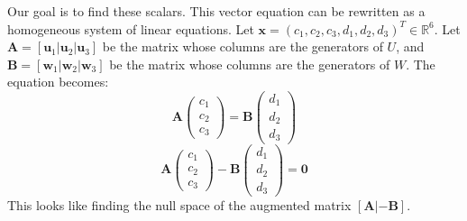 \documentclass[11pt]{article}
\theoremstyle{definition}
\theoremstyle{remark}
\newcommand{\R}{\mathbb{R}}
\newcommand{\vecu}{\mathbf{u}}
\newcommand{\vecw}{\mathbf{w}}
\newcommand{\vecx}{\mathbf{x}}
\newcommand{\veczero}{\mathbf{0}}
\newcommand{\matA}{\mathbf{A}}
\newcommand{\matB}{\mathbf{B}}
\begin{document}
Our goal is to find these scalars. This vector equation can be rewritten as a homogeneous system of linear equations. Let $\vecx = (c_1, c_2, c_3, d_1, d_2, d_3)^T \in \R^6$. Let $\matA = [\vecu_1|\vecu_2|\vecu_3]$ be the matrix whose columns are the generators of $U$, and $\matB = [\vecw_1|\vecw_2|\vecw_3]$ be the matrix whose columns are the generators of $W$. The equation becomes:
\[ \matA \begin{pmatrix} c_1 \\ c_2 \\ c_3 \end{pmatrix} = \matB \begin{pmatrix} d_1 \\ d_2 \\ d_3 \end{pmatrix} \]
\[ \matA \begin{pmatrix} c_1 \\ c_2 \\ c_3 \end{pmatrix} - \matB \begin{pmatrix} d_1 \\ d_2 \\ d_3 \end{pmatrix} = \veczero \]
This looks like finding the null space of the augmented matrix $[\matA | -\matB]$.
\end{document}
